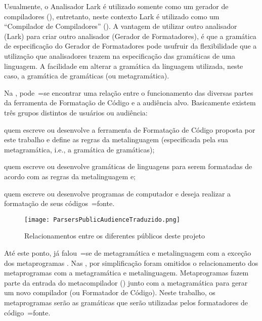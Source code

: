 Usualmente,
o Analisador Lark é utilizado somente como um gerador de compiladores (),
entretanto,
neste contexto Lark é utilizado como um ``Compilador de Compiladores'' ().
A vantagem de utilizar outro analisador (Lark) para criar outro analisador (Gerador de Formatadores),
é que a gramática de especificação do Gerador de Formatadores pode usufruir da flexibilidade que a utilização que analisadores trazem na especificação das gramáticas de uma linguagem.
A facilidade em alterar a gramática da linguagem utilizada,
neste caso,
a gramática de gramáticas (ou metagramática).

Na ,
pode~=se encontrar uma relação entre o funcionamento das diversas partes da ferramenta de Formatação de Código e
a audiência alvo.
Basicamente existem três grupos distintos de usuários ou
audiência:
\begin{inparaenum}[1)]
\item quem escreve ou
desenvolve a ferramenta de Formatação de Código proposta por este trabalho e
define as regras da metalinguagem (especificada pela sua metagramática,
i.e.,
a gramática de gramáticas);
\item quem escreve ou
desenvolve gramáticas de linguagens para serem formatadas de acordo com as regras da metalinguagem e;
\item quem escreve ou
desenvolve programas de computador e
deseja realizar a formatação de seus códigos~=fonte.
\end{inparaenum}%
\begin{figure}[!htb]
\caption{Relacionamentos entre os diferentes públicos deste projeto}
\label{figure:ParsersPublicAudienceTraduzido}
\centering
\texttt{[image: ParsersPublicAudienceTraduzido.png]}
\end{figure}

Até este ponto,
já falou~=se de metagramática e
metalinguagem com a exceção dos metaprogramas \cite{tradeoffsInMetaprogramming}.
Nas ,
por simplificação foram omitidos o relacionamento dos metaprogramas com a metagramática e
metalinguagem.
Metaprogramas fazem parte da entrada do metacompilador () junto com a metagramática para gerar um novo compilador (ou Formatador de Código).
Neste trabalho,
os metaprogramas serão as gramáticas que serão utilizadas pelos formatadores de código~=fonte.

